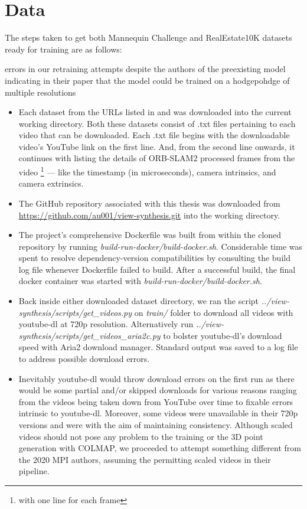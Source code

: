 \section{Data}\label{sec2:data} 

The steps taken to get both Mannequin Challenge and RealEstate10K datasets ready for training are as follows:


errors in our retraining attempts despite the authors of the preexisting model indicating in their paper that the model could be trained on a hodgepohdge of multiple resolutions   


\begin{itemize}
    \item Each dataset from the URLs listed in \cite{zhou2018stereo} and \cite{li2019learning} was downloaded into the current working directory. Both these datasets consist of .txt files pertaining to each video that can be downloaded. Each .txt file begins with the downloadable video’s YouTube link on the first line. And, from the second line onwards, it continues with listing the details of ORB-SLAM2 processed frames from the video \footnote{with one line for each frame} --- like the timestamp (in microseconds), camera intrinsics, and camera extrinsics.
    \item The GitHub repository associated with this thesis was downloaded from \url{https://github.com/au001/view-synthesis.git} into the working directory.
    \item The project's comprehensive Dockerfile was built from within the cloned repository by running \textit{build-run-docker/build-docker.sh}. Considerable time was spent to resolve dependency-version compatibilities by consulting the build log file whenever Dockerfile failed to build. After a successful build, the final docker container was started with \textit{build-run-docker/build-docker.sh}.
    \item {\sloppy Back inside either downloaded dataset directory, we ran the script \textit{../view-synthesis/scripts/get\_videos.py} on \textit{train/} folder to download all videos with youtube-dl at 720p resolution. Alternatively run \textit{../view-synthesis/scripts/get\_videos\_aria2c.py} to bolster youtube-dl’s download speed with Aria2 download manager. Standard output was saved to a log file to address possible download errors.}  
    \item Inevitably youtube-dl would throw download errors on the first run as there would be some partial and/or skipped downloads for various reasons ranging from the videos being taken down from YouTube over time to fixable errors intrinsic to youtube-dl. Moreover, some videos were unavailable in their 720p versions and were with the aim of maintaining consistency. Although scaled videos should not pose any problem to the training or the 3D point generation with COLMAP, we proceeded to attempt something different from the 2020 MPI authors, assuming the permitting scaled videos in their pipeline.

\end{itemize}
